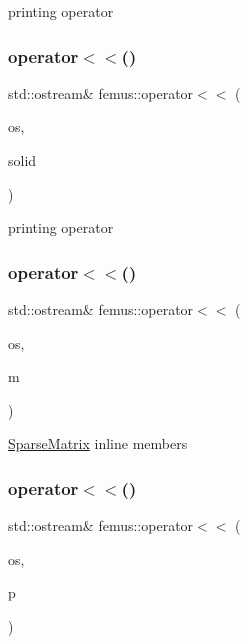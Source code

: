 printing operator \mbox{\label{namespacefemus_a14aa69576c16496872c6283133972c63}} 
\subsubsection{\texorpdfstring{operator$<$$<$()}{operator<<()}\hspace{0.1cm}{\footnotesize\ttfamily [3/5]}}
{\footnotesize\ttfamily std\+::ostream\& femus\+::operator$<$$<$ (\begin{DoxyParamCaption}\item[{std\+::ostream \&}]{os,  }\item[{const \mbox{\hyperlink{classfemus_1_1_solid}{Solid}} \&}]{solid }\end{DoxyParamCaption})}

printing operator \mbox{\label{namespacefemus_a88f7b502a0230a2f56a73940514264ca}} 
\subsubsection{\texorpdfstring{operator$<$$<$()}{operator<<()}\hspace{0.1cm}{\footnotesize\ttfamily [4/5]}}
{\footnotesize\ttfamily std\+::ostream\& femus\+::operator$<$$<$ (\begin{DoxyParamCaption}\item[{std\+::ostream \&}]{os,  }\item[{const \mbox{\hyperlink{classfemus_1_1_sparse_matrix}{Sparse\+Matrix}} \&}]{m }\end{DoxyParamCaption})\hspace{0.3cm}{\ttfamily [inline]}}

\mbox{\hyperlink{classfemus_1_1_sparse_matrix}{Sparse\+Matrix}} inline members \mbox{\label{namespacefemus_aa6ef47194a2372ade28bce682a749058}} 
\subsubsection{\texorpdfstring{operator$<$$<$()}{operator<<()}\hspace{0.1cm}{\footnotesize\ttfamily [5/5]}}
{\footnotesize\ttfamily std\+::ostream\& femus\+::operator$<$$<$ (\begin{DoxyParamCaption}\item[{std\+::ostream \&}]{os,  }\item[{const \mbox{\hyperlink{classfemus_1_1_parameters}{Parameters}} \&}]{p }\end{DoxyParamCaption})\hspace{0.3cm}{\ttfamily [inline]}}

